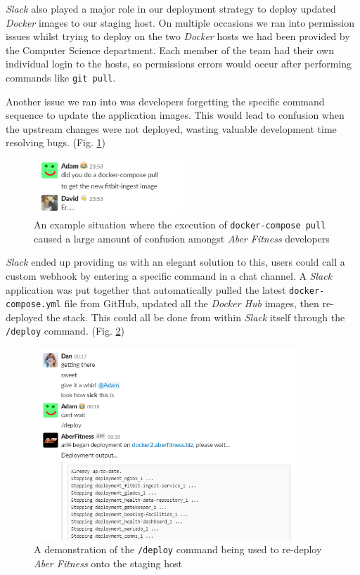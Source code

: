 \textit{Slack} also played a major role in our deployment strategy to deploy updated \textit{Docker} images to our staging host. On multiple occasions we ran into permission issues whilst trying to deploy on the two \textit{Docker} hosts we had been provided by the Computer Science department. Each member of the team had their own individual login to the hosts, so permissions errors would occur after performing commands like \lstinline{git pull}.

Another issue we ran into was developers forgetting the specific command sequence to update the application images. This would lead to confusion when the upstream changes were not deployed, wasting valuable development time resolving bugs. (Fig. \ref{fig:david_being_a_dumbass})

\begin{figure}[H]
    \centering
    \includegraphics[width=0.5\textwidth]{Images/aberfitness_slack_bot_reason_why.png}
    \caption{An example situation where the execution of \lstinline{docker-compose pull} caused a large amount of confusion amongst \textit{Aber Fitness} developers}
    \label{fig:david_being_a_dumbass}
\end{figure}

\textit{Slack} ended up providing us with an elegant solution to this, users could call a custom webhook by entering a specific command in a chat channel. A \textit{Slack} application was put together that automatically pulled the latest \lstinline{docker-compose.yml} file from GitHub, updated all the \textit{Docker Hub} images, then re-deployed the stack. This could all be done from within \textit{Slack} itself through the \lstinline{/deploy} command. (Fig. \ref{fig:slack_bot})

\begin{figure}[H]
    \centering
    \includegraphics[width=0.9\textwidth]{Images/aberfitness_slack_bot.png}
    \caption{A demonstration of the \lstinline{/deploy} command being used to re-deploy \textit{Aber Fitness} onto the staging host}
    \label{fig:slack_bot}
\end{figure}
